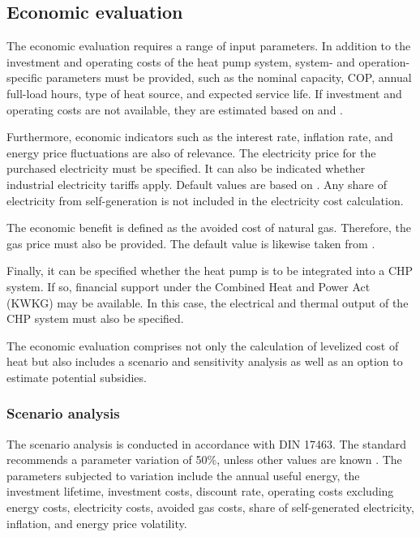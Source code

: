\documentclass[letterpaper,11pt]{article}
\begin{document}
	\subsection{Economic evaluation}
	
	The economic evaluation requires a range of input parameters. In addition to the investment and operating costs of the heat pump system, system- and operation-specific parameters must be provided, such as the nominal capacity, COP, annual full-load hours, type of heat source, and expected service life. If investment and operating costs are not available, they are estimated based on \cite{pieper2018} and \cite{BAFA2024Modul4}.
	
	Furthermore, economic indicators such as the interest rate, inflation rate, and energy price fluctuations are also of relevance. The electricity price for the purchased electricity must be specified. It can also be indicated whether industrial electricity tariffs apply. Default values are based on \cite{statisitischesbundesamt2024}. Any share of electricity from self-generation is not included in the electricity cost calculation.
	
	The economic benefit is defined as the avoided cost of natural gas. Therefore, the gas price must also be provided. The default value is likewise taken from \cite{statisitischesbundesamt2024}.
	
	Finally, it can be specified whether the heat pump is to be integrated into a CHP system. If so, financial support under the Combined Heat and Power Act (KWKG) may be available. In this case, the electrical and thermal output of the CHP system must also be specified.
	
	The economic evaluation comprises not only the calculation of levelized cost of heat but also includes a scenario and sensitivity analysis as well as an option to estimate potential subsidies.
	
		\subsubsection{Scenario analysis}
		
		The scenario analysis is conducted in accordance with DIN 17463. The standard recommends a parameter variation of 50\%, unless other values are known \cite{vdi17463}. The parameters subjected to variation include the annual useful energy, the investment lifetime, investment costs, discount rate, operating costs excluding energy costs, electricity costs, avoided gas costs, share of self-generated electricity, inflation, and energy price volatility. 
		
\end{document}
